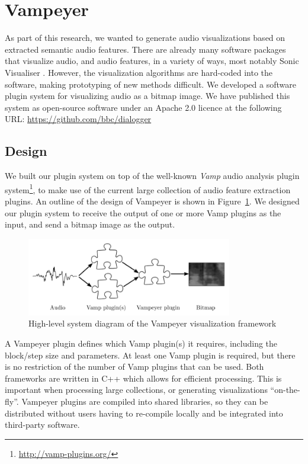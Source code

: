 \clearpage
\section{Vampeyer}\label{sec:vampeyer}
As part of this research, we wanted to generate audio visualizations based on extracted semantic audio features.  There
are already many software packages that visualize audio, and audio features, in a variety of ways, most notably Sonic
Visualiser \citep{Cannam2010}.  However, the visualization algorithms are hard-coded into the software, making
prototyping of new methods difficult.  We developed a software plugin system for visualizing audio as a bitmap image.
We have published this system as open-source software under an Apache 2.0 licence at the following URL:
\url{https://github.com/bbc/dialogger}

\subsection{Design}
We built our plugin system on top of the well-known \textit{Vamp} audio analysis plugin
system\footnote{\url{http://vamp-plugins.org/}}, to make use of the current large collection of audio feature
extraction plugins.  An outline of the design of Vampeyer is shown in Figure~\ref{fig:vampeyer}.  We designed our
plugin system to receive the output of one or more Vamp plugins as the input, and send a bitmap image as the output.

\begin{figure}[ht]
  \centering
  \includegraphics[width=0.8\textwidth]{figs/vampeyer.pdf}
  \caption{High-level system diagram of the Vampeyer visualization framework}
  \label{fig:vampeyer}
\end{figure}

A Vampeyer plugin defines which Vamp plugin(s) it requires, including the block/step size and parameters.  At least one
Vamp plugin is required, but there is no restriction of the number of Vamp plugins that can be used.  Both
frameworks are written in C++ which allows for efficient processing.  This is important when processing large
collections, or generating visualizations ``on-the-fly''.  Vampeyer plugins are compiled into shared libraries, so they can
be distributed without users having to re-compile locally and be integrated into third-party software.

